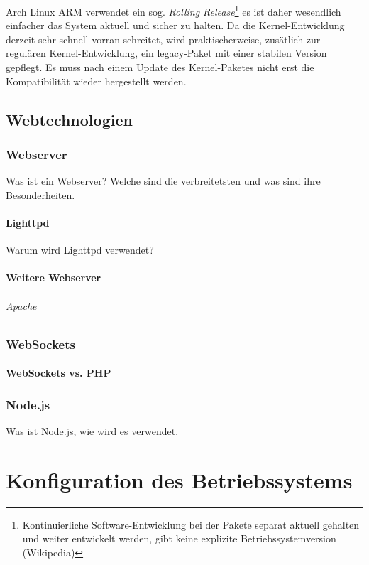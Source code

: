 \documentclass[12pt, twoside, a4paper]{scrbook}
\begin{document}
Arch Linux ARM verwendet ein sog. \textit{Rolling Release}\footnote{Kontinuierliche Software-Entwicklung bei der Pakete separat aktuell gehalten und weiter entwickelt werden, gibt keine explizite Betriebssystemversion (Wikipedia)} es ist daher wesendlich einfacher das System aktuell und sicher zu halten. Da die Kernel-Entwicklung derzeit sehr schnell vorran schreitet, wird praktischerweise, zusätlich zur regulären Kernel-Entwicklung,   ein legacy-Paket mit einer stabilen Version gepflegt. Es muss nach einem Update des Kernel-Paketes nicht erst die Kompatibilität wieder hergestellt werden.


\chapter{Webtechnologien}

\section{Webserver}
Was ist ein Webserver? Welche sind die verbreitetsten und was sind ihre Besonderheiten.
\subsection{Lighttpd}
Warum wird Lighttpd verwendet?

\subsection{Weitere Webserver}
\paragraph{Apache}

\section{WebSockets}

\subsection{WebSockets vs. PHP}

\section{Node.js}
Was ist Node.js, wie wird es verwendet.


\part{Konfiguration des Betriebssystems}
\end{document}
